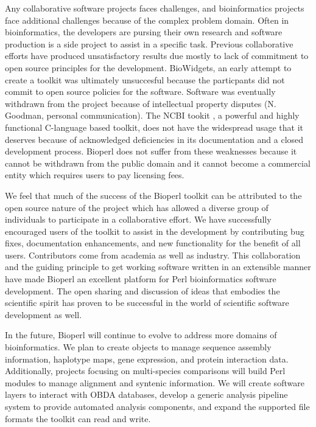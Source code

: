 \documentclass[12pt]{article}
\begin{document}
Any collaborative software projects faces challenges, and
bioinformatics projects face additional challenges because of the complex
problem domain.  Often in bioinformatics, the developers are pursing
their own research and software production is a side project to assist
in a specific task.  Previous collaborative efforts have produced
unsatisfactory results due mostly to lack of commitment to open source
principles for the development.  BioWidgets, an early attempt to
create a toolkit was ultimately unsuccesful because the particpants did
not commit to open source policies for the software.  Software was
eventually withdrawn from the project because of intellectual property
disputes (N. Goodman, personal communication).  The NCBI tookit
\cite{ncbitoolkit}, a powerful and highly functional C-language based
toolkit, does not have the widespread usage that it deserves
because of acknowledged deficiencies in its documentation and a closed
development process.  Bioperl does not suffer from these weaknesses
because it cannot be withdrawn from the public domain and it cannot
become a commercial entity which requires users to pay licensing fees.

We feel that much of the success of the Bioperl toolkit can be
attributed to the open source nature of the project which has allowed
a diverse group of individuals to participate in a collaborative effort.
We have successfully encouraged users of the toolkit to assist in the
development by contributing bug fixes, documentation enhancements, and
new functionality for the benefit of all users. Contributors come from
academia as well as industry. This collaboration and
the guiding principle to get working software written in an extensible
manner have made Bioperl an excellent platform for Perl bioinformatics
software development.  The open sharing and discussion of ideas that
embodies the scientific spirit has proven to be successful in the
world of scientific software development as well.

In the future, Bioperl will continue to evolve to address more domains
of bioinformatics.  We plan to create objects to manage sequence
assembly information, haplotype maps, gene expression, and protein
interaction data.  Additionally, projects focusing on multi-species
comparisons will build Perl modules to manage alignment and syntenic
information.  We will create software layers to interact with OBDA
databases, develop a generic analysis pipeline system to provide
automated analysis components, and expand the supported file formats
the toolkit can read and write.
\end{document}
